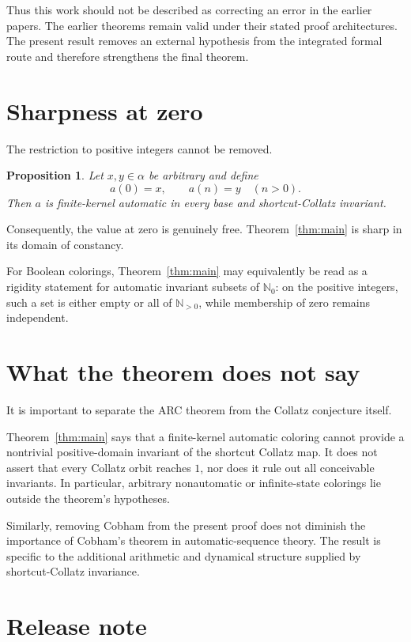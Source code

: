 \documentclass[11pt]{article}
\newtheorem{proposition}[theorem]{Proposition}
\theoremstyle{remark}
\newcommand{\N}{\mathbb{N}}
\newcommand{\Nzero}{\mathbb{N}_0}
\begin{document}
Thus this work should not be described as correcting an error in the earlier
papers.  The earlier theorems remain valid under their stated proof
architectures.  The present result removes an external hypothesis from the
integrated formal route and therefore strengthens the final theorem.

\section{Sharpness at zero}

The restriction to positive integers cannot be removed.

\begin{proposition}\label{prop:zero}
Let $x,y\in\alpha$ be arbitrary and define
\[
a(0)=x,
\qquad
a(n)=y\quad(n>0).
\]
Then $a$ is finite-kernel automatic in every base and shortcut-Collatz
invariant.
\end{proposition}

Consequently, the value at zero is genuinely free.  Theorem~\ref{thm:main}
is sharp in its domain of constancy.

For Boolean colorings, Theorem~\ref{thm:main} may equivalently be read as a
rigidity statement for automatic invariant subsets of $\Nzero$: on the
positive integers, such a set is either empty or all of $\N_{>0}$, while
membership of zero remains independent.

\section{What the theorem does not say}

It is important to separate the ARC theorem from the Collatz conjecture itself.

Theorem~\ref{thm:main} says that a finite-kernel automatic coloring cannot
provide a nontrivial positive-domain invariant of the shortcut Collatz map.
It does not assert that every Collatz orbit reaches $1$, nor does it rule out
all conceivable invariants.  In particular, arbitrary nonautomatic or
infinite-state colorings lie outside the theorem's hypotheses.

Similarly, removing Cobham from the present proof does not diminish the
importance of Cobham's theorem in automatic-sequence theory.  The result is
specific to the additional arithmetic and dynamical structure supplied by
shortcut-Collatz invariance.

\section{Release note}
\end{document}

